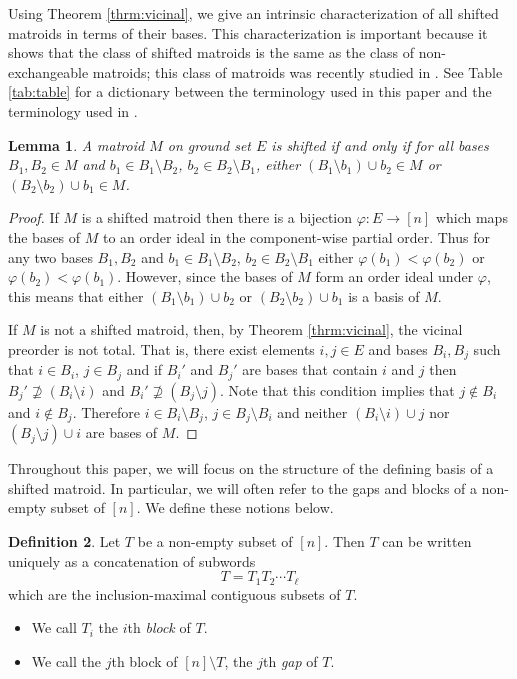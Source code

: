 \documentclass{amsart}
\theoremstyle{definition}
\newtheorem{defn}{Definition}[section]
\theoremstyle{plain}
\newtheorem{lemma}[defn]{Lemma}
\begin{document}
Using Theorem \ref{thrm:vicinal},
we give an intrinsic characterization of all shifted matroids in terms of their bases. This characterization is important because it shows that the class of shifted matroids is the same as the class of non-exchangeable matroids; this class of matroids was recently studied in \cite{DO}. See Table \ref{tab:table} for a dictionary between the terminology used in this paper and the terminology used in \cite{DO}.
\begin{lemma}
  \label{lem:shifted_char}
A matroid $M$ on ground set $E$ is shifted if and only if for all bases $B_1,B_2\in M$ and $b_1\in B_1\setminus B_2$, $b_2\in B_2\setminus B_1$, either $(B_1\setminus b_1)\cup b_2 \in M$ or $ (B_2\setminus b_2)\cup b_1 \in M$.
\end{lemma}
\begin{proof}
  If $M$ is a shifted matroid then there is a bijection $\varphi:E\to[n]$ which maps the bases of $M$ to an order ideal in the component-wise partial order. Thus for any two bases $B_1, B_2$ and $b_1\in B_1\setminus B_2$, $b_2\in B_2\setminus B_1$ either $\varphi(b_1)<\varphi(b_2)$ or $\varphi(b_2)<\varphi(b_1)$. However, since the bases of $M$ form an order ideal under $\varphi$, this means that either $(B_1\setminus b_1)\cup b_2$ or $(B_2\setminus b_2)\cup b_1$ is a basis of $M$.

  If $M$ is not a shifted matroid, then, by Theorem \ref{thrm:vicinal}, the vicinal preorder is not total. That is, there exist elements $i,j\in E$ and bases $B_i,B_j$ such that $i\in B_i$, $j\in B_j$ and if $B_i'$ and $B_j'$ are bases that contain $i$ and $j$ then $B_j'\not\supseteq (B_i\setminus i)$ and $B_i'\not\supseteq (B_j\setminus j)$. Note that this condition implies that $j\not\in B_i$ and $i\not\in B_j$. Therefore $i\in B_i\setminus B_j$, $j\in B_j\setminus B_i$ and neither $(B_i\setminus i)\cup j$ nor $(B_j\setminus j)\cup i$ are bases of $M$.
\end{proof}

Throughout this paper, we will focus on the structure of the defining basis of a shifted matroid. In particular, we will often refer to the gaps and blocks of a non-empty subset of $[n]$. We define these notions below.

\begin{defn}
  \label{defn:blocks}
Let $T$ be a non-empty subset of $[n]$. Then $T$ can be written uniquely as a concatenation of subwords \[T=T_1 T_2 \cdots  T_\ell\] which are the inclusion-maximal contiguous subsets of $T$. 
\begin{itemize}
\item We call $T_i$ the $i$th \emph{block} of $T$. 
\item We call the $j$th block of $[n]\setminus T$, the $j$th \emph{gap} of $T$.
\end{itemize}
\end{defn}
\end{document}
